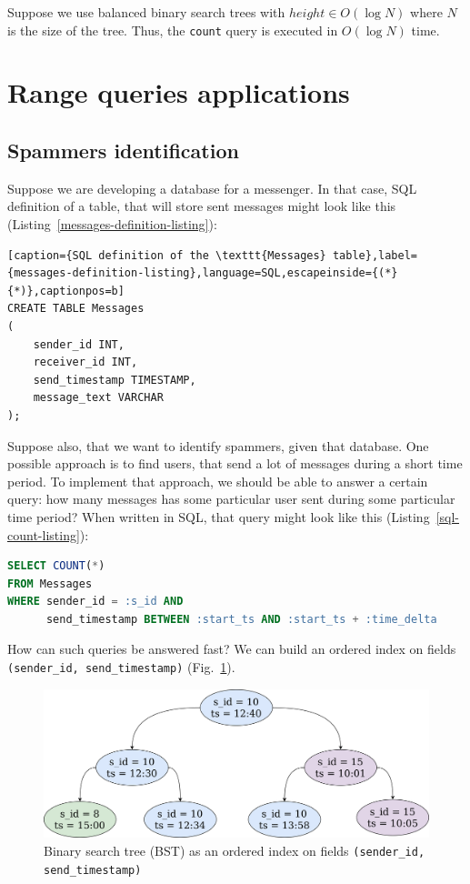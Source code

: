 \documentclass[times, dvipsnames,%
               languages={russian,english} %
              ]{itmo-student-thesis}
\begin{document}
Suppose we use balanced binary search trees with $height \in O(\log N)$ where $N$ is the size of the tree. Thus, the \texttt{count} query is executed in $O(\log N)$ time.

\section{Range queries applications}

\subsection{Spammers identification}

Suppose we are developing a database for a messenger. In that case, SQL definition of a table, that will store sent messages might look like this (Listing~\ref{messages-definition-listing}):

\renewcommand{\lstlistingname}{Listing}
\begin{lstlisting}[caption={SQL definition of the \texttt{Messages} table},label={messages-definition-listing},language=SQL,escapeinside={(*}{*)},captionpos=b]
CREATE TABLE Messages
(
    sender_id INT,
    receiver_id INT,
    send_timestamp TIMESTAMP,
    message_text VARCHAR
);
\end{lstlisting}

Suppose also, that we want to identify spammers, given that database. One possible approach is to find users, that send a lot of messages during a short time period. To implement that approach, we should be able to answer a certain query: how many messages has some particular user sent during some particular time period? When written in SQL, that query might look like this (Listing~\ref{sql-count-listing}):

\renewcommand{\lstlistingname}{Listing}
\begin{lstlisting}[caption={SQL query for getting the number of messages, sent by a particular user during a particular time period},label={sql-count-listing},language=SQL,captionpos=b]
SELECT COUNT(*)
FROM Messages
WHERE sender_id = :s_id AND 
      send_timestamp BETWEEN :start_ts AND :start_ts + :time_delta
\end{lstlisting}

How can such queries be answered fast? We can build an ordered index on fields \texttt{(sender\_id, send\_timestamp)} (Fig.~\ref{SQL-index}).

\begin{figure}[H]
  \centering
  \caption{Binary search tree (BST) as an ordered index on fields \texttt{(sender\_id, send\_timestamp)}}
  \label{SQL-index}
  \includegraphics[width=\linewidth]{pics/sql-index.png}
\end{figure}
\end{document}

